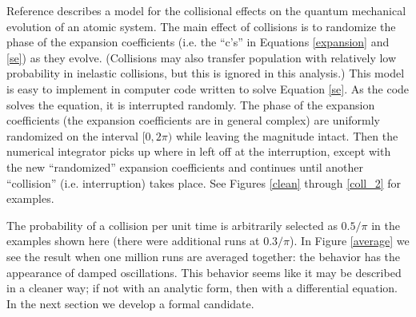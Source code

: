 \label{model}


Reference \cite{Siegman:1986a} describes a model for the collisional effects on the quantum mechanical evolution of an atomic system. The main effect of collisions is to randomize the phase of the expansion coefficients (i.e. the ``c's'' in Equations \ref{expansion} and \ref{se}) as they evolve. (Collisions may also transfer population with relatively low probability in inelastic collisions, but this is ignored in this analysis.) This model is easy to implement in computer code written to solve Equation \ref{se}. As the code solves the equation, it is interrupted randomly. The phase of the expansion coefficients (the expansion coefficients are in general complex) are uniformly randomized on the interval $[0,2\pi)$ while leaving the magnitude intact. Then the numerical integrator picks up where in left off at the interruption, except with the new ``randomized'' expansion coefficients and continues until another ``collision'' (i.e. interruption) takes place. See Figures \ref{clean} through \ref{coll_2} for examples.

The probability of a collision per unit time is arbitrarily selected as $0.5/\pi$ in the examples shown here (there were additional runs at $0.3/\pi$). In Figure \ref{average} we see the result when one million runs are averaged together: the behavior has the appearance of damped oscillations. This behavior seems like it may be described in a cleaner way; if not with an analytic form, then with a differential equation. In the next section we develop a formal candidate.

